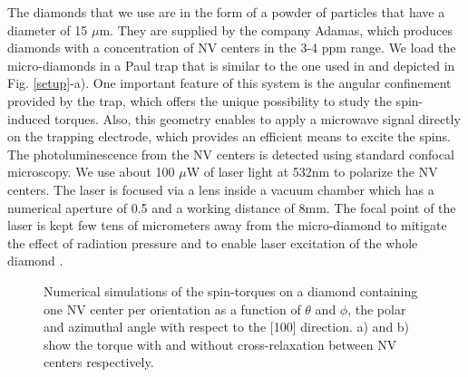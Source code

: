 \documentclass[preprintnumbers,amsmath,amssymb,superscriptaddress,twocolumn,showpacs]{revtex4-1}
\begin{document}
The diamonds that we use are in the form of a powder of particles that have a diameter of 15 $\mu$m. They are supplied by the company Adamas, which produces diamonds with a concentration of NV centers in the 3-4 ppm range. %
We load the micro-diamonds in a Paul trap that is similar to the one used in \cite{DelordPRL} and depicted in Fig. \ref{setup}-a). One important feature of this system is the angular confinement provided by the trap, which offers the unique possibility to study the spin-induced torques.
Also, this geometry enables to apply a microwave signal directly on the trapping electrode, which provides an efficient means to excite the spins.
The photoluminescence from the NV centers is detected using standard confocal microscopy. We use about 100 $\mu$W of laser light at 532nm to polarize the NV centers. The laser is focused via a lens inside a vacuum chamber which has a numerical aperture of 0.5 and a working distance of 8mm. The focal point of the laser is kept few tens of micrometers away from the micro-diamond to mitigate the effect of radiation pressure and to enable laser excitation of the whole diamond \cite{DelordPRL,delord2016}. 

\begin{figure}[!ht]
  \centering {}
  \caption{Numerical simulations of the spin-torques on a diamond containing one NV center per orientation as a function of $\theta$ and $\phi$, the polar and azimuthal angle with respect to the [100] direction. a) and b) show the torque with and without cross-relaxation between NV centers respectively.}
  \label{Numerics}
\end{figure}
\end{document}
